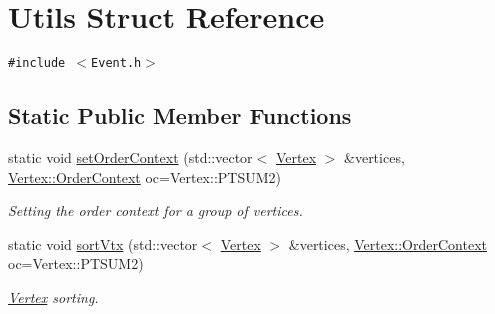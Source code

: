 \hypertarget{structUtils}{
\section{Utils Struct Reference}
\label{structUtils}
}
{\tt \#include $<$Event.h$>$}

\subsection*{Static Public Member Functions}
\begin{CompactItemize}
\item 
static void \hyperlink{structUtils_69035af71f5fb92ea00e07fa70c8c517}{set\-Order\-Context} (std::vector$<$ \hyperlink{classVertex}{Vertex} $>$ \&vertices, \hyperlink{classVertex_40a06cc3fde98913c8259e3c11cd37ec}{Vertex::Order\-Context} oc=Vertex::PTSUM2)
\begin{CompactList}\small\item\em Setting the order context for a group of vertices. \item\end{CompactList}\item 
static void \hyperlink{structUtils_85ca39cbe948e63a71b0f18d3860c218}{sort\-Vtx} (std::vector$<$ \hyperlink{classVertex}{Vertex} $>$ \&vertices, \hyperlink{classVertex_40a06cc3fde98913c8259e3c11cd37ec}{Vertex::Order\-Context} oc=Vertex::PTSUM2)
\begin{CompactList}\small\item\em \hyperlink{classVertex}{Vertex} sorting. \item\end{CompactList}\end{CompactItemize}
